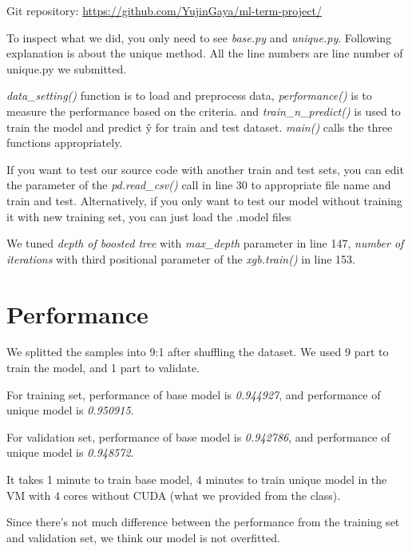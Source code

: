 \documentclass{article}
\begin{document}

Git repository: \url{https://github.com/YujinGaya/ml-term-project/}

To inspect what we did, you only need to see \textit{base.py} and \textit{unique.py}.
Following explanation is about the unique method. All the line numbers are line number of unique.py we submitted.

\textit{data\_setting()} function is to load and preprocess data, \textit{performance()} is to measure the performance based on the criteria. and \textit{train\_n\_predict()} is used to train the model and predict \^{y} for train and test dataset. \textit{main()} calls the three functions appropriately.

If you want to test our source code with another train and test sets, you can edit the parameter of the \textit{pd.read\_csv()} call in line 30 to appropriate file name and train and test. Alternatively, if you only want to test our model without training it with new training set, you can just load the .model files

We tuned \textit{depth of boosted tree} with \textit{max\_depth} parameter in line 147, \textit{number of iterations} with third positional parameter of the \textit{xgb.train()} in line 153.

\section{Performance}

We splitted the samples into 9:1 after shuffling the dataset. We used 9 part to train the model, and 1 part to validate.

For training set, performance of base model is \textit{0.944927}, and performance of unique model is \textit{0.950915}.

For validation set, performance of base model is \textit{0.942786}, and performance of unique model is \textit{0.948572}.

It takes 1 minute to train base model, 4 minutes to train unique model in the VM with 4 cores without CUDA (what we provided from the class).

Since there's not much difference between the performance from the training set and validation set, we think our model is not overfitted.
\end{document}
